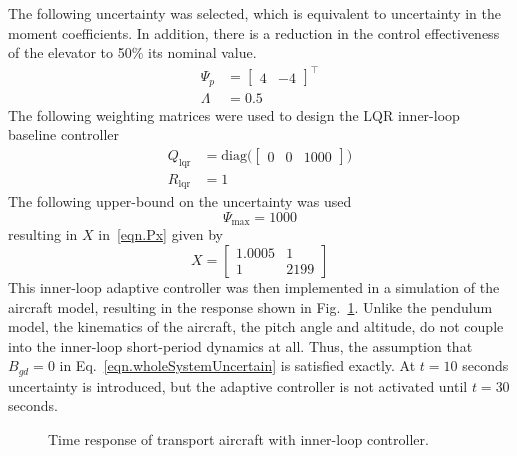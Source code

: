 The following uncertainty was selected, which is equivalent to uncertainty in the moment coefficients.
In addition, there is a reduction in the control effectiveness of the elevator to 50\% its nominal value.
\begin{equation*}
  \begin{split}
    \Psi_{p}
    &=
    \begin{bmatrix}
      4 & -4
    \end{bmatrix}^{\top} \\
    \Lambda
    &=
    0.5
  \end{split}
\end{equation*}
The following weighting matrices were used to design the LQR inner-loop baseline controller
\begin{equation*}
  \begin{split}
    Q_{\text{lqr}}
    &=
    \text{diag}\bigr(
    \begin{bmatrix}
      0 & 0 & 1000
    \end{bmatrix}\bigr) \\
    R_{\text{lqr}}
    &=
    1
  \end{split}
\end{equation*}
The following upper-bound on the uncertainty was used
\begin{equation*}
  \Psi_{\text{max}} = 1000
\end{equation*}
resulting in $X$ in\ \eqref{eqn.Px} given by
\begin{equation*}
  X =
  \begin{bmatrix}
    1.0005 & 1 \\
    1 & 2199
  \end{bmatrix}
\end{equation*}
This inner-loop adaptive controller was then implemented in a simulation of the aircraft model, resulting in the response shown in Fig.~\ref{fig.innerLoopTransportLong}.
Unlike the pendulum model, the kinematics of the aircraft, the pitch angle and altitude, do not couple into the inner-loop short-period dynamics at all.
Thus, the assumption that $B_{gd}=0$ in Eq.\ \eqref{eqn.wholeSystemUncertain} is satisfied exactly.
At $t=10$ seconds uncertainty is introduced, but the adaptive controller is not activated until $t=30$ seconds.

\newpage
\begin{figure}[H]
  \hspace{-0.0in}
  \noindent{}
  \vspace{-0.95in}
  \caption{Time response of transport aircraft with inner-loop controller.\label{fig.innerLoopTransportLong}}
\end{figure}

